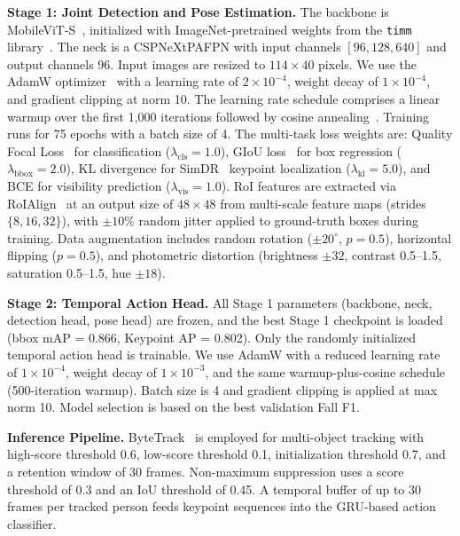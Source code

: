\textbf{Stage 1: Joint Detection and Pose Estimation.}
The backbone is MobileViT-S~\cite{mehta2022mobilevit}, initialized with ImageNet-pretrained weights from the \texttt{timm} library~\cite{rw2019timm}. The neck is a CSPNeXtPAFPN with input channels $[96, 128, 640]$ and output channels 96. Input images are resized to $114 \times 40$ pixels. We use the AdamW optimizer~\cite{loshchilov2019decoupled} with a learning rate of $2 \times 10^{-4}$, weight decay of $1 \times 10^{-4}$, and gradient clipping at norm 10. The learning rate schedule comprises a linear warmup over the first 1{,}000 iterations followed by cosine annealing~\cite{loshchilov2017sgdr}. Training runs for 75 epochs with a batch size of 4. The multi-task loss weights are: Quality Focal Loss~\cite{li2020generalized} for classification ($\lambda_{\text{cls}} = 1.0$), GIoU loss~\cite{rezatofighi2019generalized} for box regression ($\lambda_{\text{bbox}} = 2.0$), KL divergence for SimDR~\cite{li20212d} keypoint localization ($\lambda_{\text{kl}} = 5.0$), and BCE for visibility prediction ($\lambda_{\text{vis}} = 1.0$). RoI features are extracted via RoIAlign~\cite{he2017mask} at an output size of $48 \times 48$ from multi-scale feature maps (strides $\{8, 16, 32\}$), with $\pm 10\%$ random jitter applied to ground-truth boxes during training. Data augmentation includes random rotation ($\pm 20^{\circ}$, $p = 0.5$), horizontal flipping ($p = 0.5$), and photometric distortion (brightness $\pm 32$, contrast 0.5--1.5, saturation 0.5--1.5, hue $\pm 18$).

\textbf{Stage 2: Temporal Action Head.}
All Stage 1 parameters (backbone, neck, detection head, pose head) are frozen, and the best Stage 1 checkpoint is loaded (bbox mAP = 0.866, Keypoint AP = 0.802). Only the randomly initialized temporal action head is trainable. We use AdamW with a reduced learning rate of $1 \times 10^{-4}$, weight decay of $1 \times 10^{-3}$, and the same warmup-plus-cosine schedule (500-iteration warmup). Batch size is 4 and gradient clipping is applied at max norm 10. Model selection is based on the best validation Fall F1.

\textbf{Inference Pipeline.}
ByteTrack~\cite{zhang2022bytetrack} is employed for multi-object tracking with high-score threshold 0.6, low-score threshold 0.1, initialization threshold 0.7, and a retention window of 30 frames. Non-maximum suppression uses a score threshold of 0.3 and an IoU threshold of 0.45. A temporal buffer of up to 30 frames per tracked person feeds keypoint sequences into the GRU-based action classifier.

